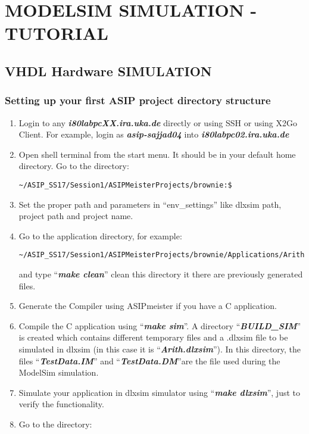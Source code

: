 \chapter*{MODELSIM SIMULATION -TUTORIAL}
\section*{VHDL Hardware SIMULATION}
\subsection{Setting up your first ASIP project directory structure}
\begin{enumerate}
\item Login to any \emph{\textbf{i80labpcXX.ira.uka.de}} directly or using SSH or using X2Go Client. For example, login as
	\emph{\textbf{asip-sajjad04}} into \emph{\textbf{i80labpc02.ira.uka.de}}
\item Open shell terminal from the start menu. It should be in your default home directory. Go to the directory:
\begin{lstlisting} 
~/ASIP_SS17/Session1/ASIPMeisterProjects/brownie:$ 
\end{lstlisting}
\item Set the proper path and parameters in ``env\_settings'' like dlxsim path, project path and project name.
\item Go to the application directory, for example:
\begin{lstlisting} 
~/ASIP_SS17/Session1/ASIPMeisterProjects/brownie/Applications/Arith:$
\end{lstlisting}
	and type ``\emph{\textbf{make clean}}'' clean this directory it there are previously generated files.
\item Generate the Compiler using ASIPmeister if you have a C application.
\item Compile the C application using ``\emph{\textbf{make sim}}''. A directory ``\emph{\textbf{BUILD\_SIM}}'' is created which contains different temporary files and a .dlxsim file to be simulated in dlxsim (in this case it is ``\emph{\textbf{Arith.dlxsim}}''). In this directory, the files ``\emph{\textbf{TestData.IM}}'' and
	``\emph{\textbf{TestData.DM}}''are the file used during the ModelSim simulation.
\item Simulate your application in dlxsim simulator using ``\emph{\textbf{make dlxsim}}'', just to verify the functionality.
\item Go to the directory:
\begin{lstlisting} 

\end{lstlisting}
\end{enumerate}
